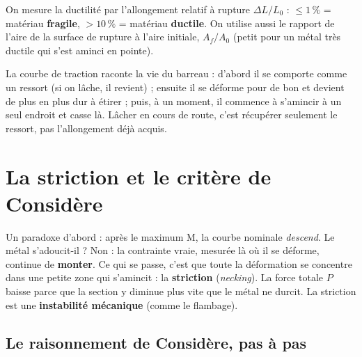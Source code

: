 \begin{rembox}[title=Ductile ou fragile]
On mesure la ductilité par l'allongement relatif à rupture $\Delta L/L_0$ :
$\le 1\,\%$ = matériau \textbf{fragile}, $> 10\,\%$ = matériau \textbf{ductile}. On utilise
aussi le rapport de l'aire de la surface de rupture à l'aire initiale, $A_f/A_0$ (petit pour un
métal très ductile qui s'est aminci en pointe).
\end{rembox}

\begin{goatbox}
La courbe de traction raconte la vie du barreau : d'abord il se comporte comme un ressort
(si on lâche, il revient) ; ensuite il se déforme pour de bon et devient de plus en plus dur à
étirer ; puis, à un moment, il commence à s'amincir à un seul endroit et casse là. Lâcher en
cours de route, c'est récupérer seulement le \og ressort\fg{}, pas l'allongement déjà acquis.
\end{goatbox}

\section{La striction et le critère de Considère}


Un paradoxe d'abord : après le maximum M, la courbe nominale \emph{descend}. Le métal
s'adoucit-il ? Non : la contrainte vraie, mesurée là où il se déforme, continue de
\textbf{monter}. Ce qui se passe, c'est que toute la déformation se concentre dans une petite
zone qui s'amincit : la \textbf{striction} (\emph{necking}). La force totale $P$ baisse parce
que la section y diminue plus vite que le métal ne durcit. La striction est une
\textbf{instabilité mécanique} (comme le flambage).

\subsection*{Le raisonnement de Considère, pas à pas}

